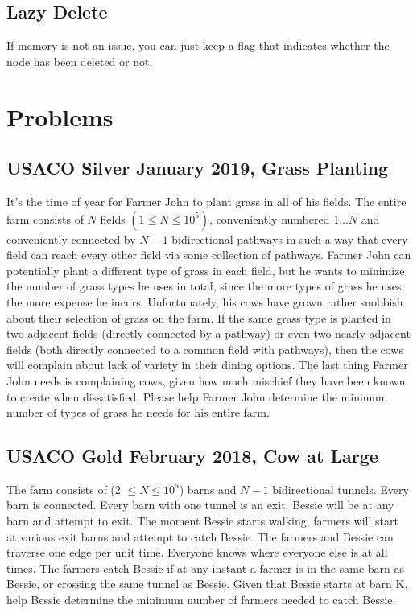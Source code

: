 \documentclass{article}
\begin{document}
\subsection{Lazy Delete}
If memory is not an issue, you can just keep a flag that indicates whether the node has been deleted or not. 

\section{Problems}
\subsection{USACO Silver January 2019, Grass Planting}
It's the time of year for Farmer John to plant grass in all of his fields. The entire farm consists of $N$ fields $(1 \leq N \leq 10^5)$, conveniently numbered $1...N$ and conveniently connected by $N-1$ bidirectional pathways in such a way that every field can reach every other field via some collection of pathways.
Farmer John can potentially plant a different type of grass in each field, but he wants to minimize the number of grass types he uses in total, since the more types of grass he uses, the more expense he incurs. Unfortunately, his cows have grown rather snobbish about their selection of grass on the farm. If the same grass type is planted in two adjacent fields (directly connected by a pathway) or even two nearly-adjacent fields (both directly connected to a common field with pathways), then the cows will complain about lack of variety in their dining options. The last thing Farmer John needs is complaining cows, given how much mischief they have been known to create when dissatisfied.
Please help Farmer John determine the minimum number of types of grass he needs for his entire farm.
\subsection{USACO Gold February 2018, Cow at Large}
The farm consists of (2 $\leq N \leq 10^5$) barns and $N-1$ bidirectional tunnels. Every barn is connected. Every barn with one tunnel is an exit. Bessie will be at any barn and attempt to exit. The moment Bessie starts walking, farmers will start at various exit barns and attempt to catch Bessie. The farmers and Bessie can traverse one edge per unit time. Everyone knows where everyone else is at all times. The farmers catch Bessie if at any instant a farmer is in the same barn as Bessie, or crossing the same tunnel as Bessie. Given that Bessie starts at barn K, help Bessie determine the minimum number of farmers needed to catch Bessie.
\end{document}
